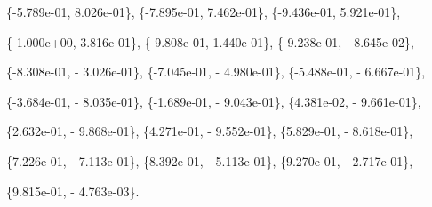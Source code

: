 \documentclass{article}
\begin{document}
\{-5.789e-01, 8.026e-01\},
\{-7.895e-01, 7.462e-01\},
\{-9.436e-01, 5.921e-01\},

\{-1.000e+00, 3.816e-01\}, 
\{-9.808e-01, 1.440e-01\}, 
\{-9.238e-01, - 8.645e-02\}, 

\{-8.308e-01, - 3.026e-01\},
\{-7.045e-01, - 4.980e-01\}, 
\{-5.488e-01, - 6.667e-01\},

\{-3.684e-01, - 8.035e-01\}, 
\{-1.689e-01, - 9.043e-01\},
\{4.381e-02, - 9.661e-01\},

\{2.632e-01, - 9.868e-01\}, 
\{4.271e-01, - 9.552e-01\}, 
\{5.829e-01, - 8.618e-01\},

\{7.226e-01, - 7.113e-01\},
\{8.392e-01, - 5.113e-01\},
\{9.270e-01, - 2.717e-01\}, 

\{9.815e-01, - 4.763e-03\}.

\end{document}
